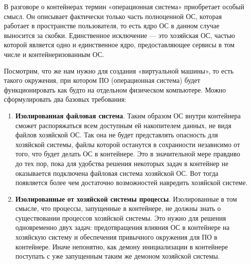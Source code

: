 \documentclass[14pt, a4paper]{article}
\begin{document}
В разговоре о контейнерах термин «операционная система» приобретает особый смысл. Он
описывает фактически только часть полноценной ОС, которая работает в пространстве пользователя,
то есть ядро ОС в данном случае выносится за скобки. Единственное исключение — это хозяйская
ОС, частью которой является одно и единственное ядро, предоставляющее сервисы в том числе и
контейнеризованным ОС.

\begin{figure}[h]%
    \centering
    \label{1.0}
\end{figure}

Посмотрим, что же нам нужно для создания «виртуальной машины», то есть такого окружения, при
котором ПО (операционная система) будет функционировать как будто на отдельном физическом
компьютере. Можно сформулировать два базовых требования:

\begin{enumerate}
    \item \textbf{Изолированная файловая система}. Таким образом ОС внутри контейнера сможет
    распоряжаться всем доступным ей накопителем данных, не видя файлов хозяйской ОС. Так
    она не будет представлять опасность для хозяйской системы, файлы которой останутся в
    сохранности независимо от того, что будет делать ОС в контейнере. Это в значительной мере
    правдиво до тех пор, пока для удобства решения некоторых задач в контейнер не оказывается
    подключена файловая система хозяйской ОС. Вот тогда появляется более чем достаточно
    возможностей навредить хозяйской системе.
    \item \textbf{Изолированные от хозяйской системы процессы}. Изолированные в том смысле, что
    процессы, запущенные в контейнере, не должны знать о существовании процессов хозяйской
    системы. Это нужно для решения одновременно двух задач: предотвращения влияния ОС в
    контейнере на хозяйскую систему и обеспечения привычного окружения для ПО в контейнере.
    Иначе непонятно, как демону инициализации в контейнере поступать с уже запущенным таким
    же демоном хозяйской системы.
\end{enumerate}
\end{document}
